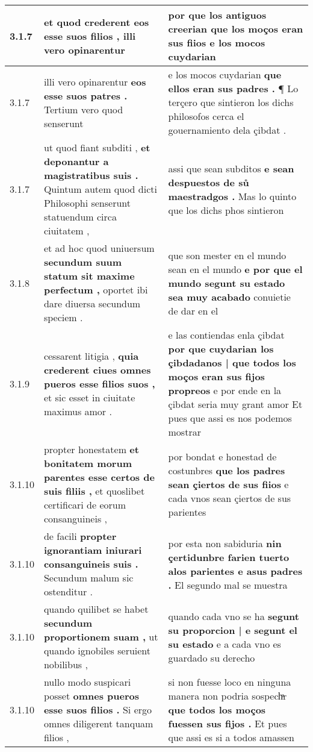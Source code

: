 \begin{tabular}{|p{1cm}|p{6.5cm}|p{6.5cm}|}
3.1.7 & et quod crederent \textbf{ eos esse suos filios , } illi vero opinarentur & por que los antiguos creerian \textbf{ que los moços eran sus fiios } e los mocos cuydarian \\\hline
3.1.7 & illi vero opinarentur \textbf{ eos esse suos patres . } Tertium vero quod senserunt & e los mocos cuydarian \textbf{ que ellos eran sus padres . } ¶ Lo terçero que sintieron los dichs philosofos cerca el gouernamiento dela çibdat . \\\hline
3.1.7 & ut quod fiant subditi , \textbf{ et deponantur a magistratibus suis . } Quintum autem quod dicti Philosophi senserunt statuendum circa ciuitatem , & assi que sean subditos \textbf{ e sean despuestos de sů maestradgos . } Mas lo quinto que los dichs phos sintieron \\\hline
3.1.8 & et ad hoc quod uniuersum \textbf{ secundum suum statum sit maxime perfectum , } oportet ibi dare diuersa secundum speciem . & que son mester en el mundo sean en el mundo \textbf{ e por que el mundo segunt su estado sea muy acabado } conuietie de dar en el \\\hline
3.1.9 & cessarent litigia , \textbf{ quia crederent ciues omnes pueros esse filios suos , } et sic esset in ciuitate maximus amor . & e las contiendas enla çibdat \textbf{ por que cuydarian los çibdadanos | que todos los moços eran sus fijos propreos } e por ende en la çibdat seria muy grant amor Et pues que assi es nos podemos mostrar \\\hline
3.1.10 & propter honestatem \textbf{ et bonitatem morum parentes esse certos de suis filiis , } et quoslibet certificari de eorum consanguineis , & por bondat e honestad de costunbres \textbf{ que los padres sean çiertos de sus fiios } e cada vnos sean çiertos de sus parientes \\\hline
3.1.10 & de facili \textbf{ propter ignorantiam iniurari consanguineis suis . } Secundum malum sic ostenditur . & por esta non sabiduria \textbf{ nin çertidunbre farien tuerto alos parientes e asus padres . } El segundo mal se muestra \\\hline
3.1.10 & quando quilibet se habet \textbf{ secundum proportionem suam , } ut quando ignobiles seruient nobilibus , & quando cada vno se ha \textbf{ segunt su proporcion | e segunt el su estado } e a cada vno es guardado su derecho \\\hline
3.1.10 & nullo modo suspicari posset \textbf{ omnes pueros esse suos filios . } Si ergo omnes diligerent tanquam filios , & si non fuesse loco en ninguna manera non podria sospechͣr \textbf{ que todos los moços fuessen sus fijos . } Et pues que assi es si a todos amassen \\\hline

\end{tabular}
